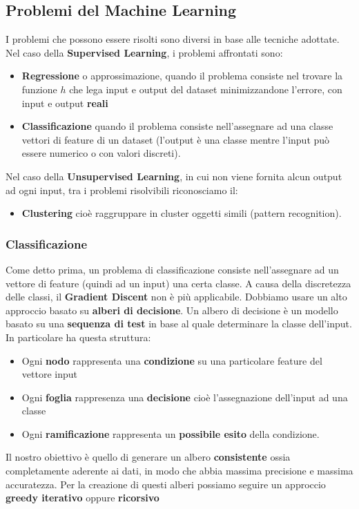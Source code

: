 \subsection{Problemi del Machine Learning}
I problemi che possono essere risolti sono diversi in base alle tecniche adottate.\\
Nel caso della \textbf{Supervised Learning}, i problemi affrontati sono:
\begin{itemize}
    \item \textbf{Regressione} o approssimazione, quando il problema consiste nel trovare la funzione $h$ che lega input e output del dataset minimizzandone l'errore, con input e output \textbf{reali}
    \item \textbf{Classificazione} quando il problema consiste nell'assegnare ad una classe vettori di feature di un dataset (l'output è una classe mentre l'input può essere numerico o con valori discreti).
\end{itemize}
Nel caso della \textbf{Unsupervised Learning}, in cui non viene fornita alcun output ad ogni input, tra i problemi risolvibili riconosciamo il:
\begin{itemize}
    \item \textbf{Clustering} cioè raggruppare in cluster oggetti simili (pattern recognition).
\end{itemize}

\subsubsection{Classificazione}
Come detto prima, un problema di classificazione consiste nell'assegnare ad un vettore di feature (quindi ad un input) una certa classe. A causa
della discretezza delle classi, il \textbf{Gradient Discent} non è più applicabile. Dobbiamo usare un alto approccio basato su \textbf{alberi di decisione}.
Un albero di decisione è un modello basato su una \textbf{sequenza di test} in base al quale determinare la classe dell'input.
In particolare ha questa struttura:
\begin{itemize}
    \item Ogni \textbf{nodo} rappresenta una \textbf{condizione }su una particolare feature del vettore input
    \item Ogni \textbf{foglia} rappresenza una \textbf{decisione} cioè l'assegnazione dell'input ad una classe
    \item Ogni \textbf{ramificazione} rappresenta un \textbf{possibile esito} della condizione.
\end{itemize}
Il nostro obiettivo è quello di generare un albero \textbf{consistente} ossia completamente aderente ai dati, in modo che abbia massima precisione
e massima accuratezza.
Per la creazione di questi alberi possiamo seguire un approccio \textbf{greedy iterativo} oppure \textbf{ricorsivo}

